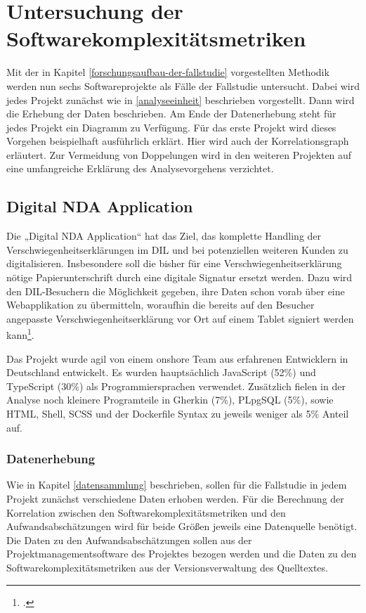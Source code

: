 \chapter{Untersuchung der Softwarekomplexitätsmetriken}\label{untersuchung-der-softwarekomplexituxe4tsmetriken}

Mit der in Kapitel \ref{forschungsaufbau-der-fallstudie} vorgestellten Methodik werden nun sechs
Softwareprojekte als Fälle der Fallstudie untersucht. Dabei wird jedes
Projekt zunächst wie in \ref{analyseeinheit} beschrieben vorgestellt. Dann wird die
Erhebung der Daten beschrieben. Am Ende der Datenerhebung steht für
jedes Projekt ein Diagramm zu Verfügung. Für das erste Projekt wird
dieses Vorgehen beispielhaft ausführlich erklärt. Hier wird auch der
Korrelationsgraph erläutert. Zur Vermeidung von Doppelungen wird in den
weiteren Projekten auf eine umfangreiche Erklärung des Analysevorgehens
verzichtet.

\section{Digital NDA Application}\label{digital-nda-application}

Die „Digital \ac{NDA} Application`` hat das Ziel, das komplette Handling der
Verschwiegenheitserklärungen im \ac{DIL} und bei potenziellen weiteren Kunden
zu digitalisieren. Insbesondere soll die bisher für eine
Verschwiegenheitserklärung nötige Papierunterschrift durch eine digitale
Signatur ersetzt werden. Dazu wird den \ac{DIL}-Besuchern die Möglichkeit
gegeben, ihre Daten schon vorab über eine Webapplikation zu übermitteln,
woraufhin die bereits auf den Besucher angepasste
Verschwiegenheitserklärung vor Ort auf einem Tablet signiert werden
kann\footcite[Vgl. ][]{dxctechnologiesInternesDokumentAufbau2022}.

Das Projekt wurde agil von einem onshore Team aus erfahrenen Entwicklern
in Deutschland entwickelt. Es wurden hauptsächlich JavaScript
(52\%) und TypeScript (30\%)
als Programmiersprachen verwendet. Zusätzlich fielen in der Analyse noch
kleinere Programteile in Gherkin (7\%), PLpgSQL (5\%), sowie \ac{HTML},
Shell, SCSS und der Dockerfile Syntax zu jeweils weniger als 5\% Anteil
auf.

\subsection{Datenerhebung}\label{nda-Datenerhebung}

Wie in Kapitel \ref{datensammlung} beschrieben, sollen für die Fallstudie in jedem
Projekt zunächst verschiedene Daten erhoben werden. Für die Berechnung
der Korrelation zwischen den Softwarekomplexitätsmetriken und den
Aufwandsabschätzungen wird für beide Größen jeweils eine Datenquelle
benötigt. Die Daten zu den Aufwandsabschätzungen sollen aus der
Projektmanagementsoftware des Projektes bezogen werden und die Daten zu
den Softwarekomplexitätsmetriken aus der Versionsverwaltung des
Quelltextes.

